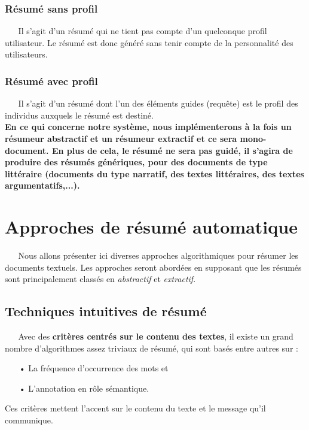 \subsubsection{Résumé sans profil}
$ _{} $ $ _{} $ $ _{} $ $ _{} $ $ _{} $Il s'agit d'un résumé qui ne tient pas compte d'un quelconque profil utilisateur. Le résumé est donc généré sans tenir compte de la personnalité des utilisateurs.
\subsubsection{Résumé avec profil}
$ _{} $ $ _{} $ $ _{} $ $ _{} $ $ _{} $Il s'agit d'un résumé dont l'un des éléments guides (requête) est le profil des individus auxquels le résumé est destiné.\\

\textbf{En ce qui concerne notre système, nous implémenterons à la fois un résumeur abstractif et un résumeur extractif et ce sera mono-document. En plus de cela, le résumé ne sera pas guidé, il s'agira de produire des résumés génériques, pour des documents de type littéraire (documents du type narratif, des textes littéraires, des textes argumentatifs,...).}
\section{Approches de résumé automatique}
$ _{} $ $ _{} $ $ _{} $ $ _{} $ $ _{} $Nous allons présenter ici diverses approches algorithmiques pour résumer les documents textuels. Les approches seront abordées en supposant que les résumés sont prin\-ci\-pa\-le\-ment classés en \textit{abstractif} et \textit{extractif}.
\subsection{Techniques intuitives de résumé \cite{MaaliMnasri}}
$ _{} $ $ _{} $ $ _{} $ $ _{} $ $ _{} $Avec des \textbf{critères centrés sur le contenu des textes}, il existe un grand nombre d'al\-go\-ri\-thmes assez triviaux de résumé, qui sont basés entre autres sur :
\begin{itemize}
\item[•] La fréquence d'occurrence des mots et
\item[•] L'annotation en rôle sémantique.
\end{itemize}
Ces critères mettent l'accent sur le contenu du texte et le message qu'il communique.
